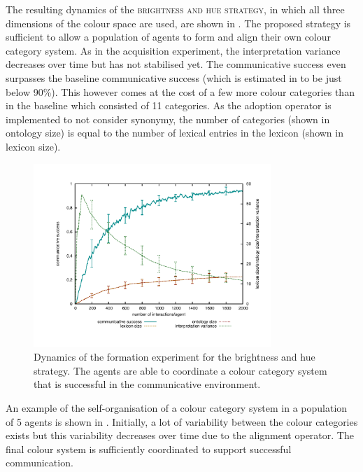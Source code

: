 The resulting dynamics of the \textsc{brightness and hue strategy}, in
which all three dimensions of the colour space are used, are shown in
. The proposed strategy is
sufficient to allow a population of agents to form and align their own
colour category system. As in the acquisition experiment, the
interpretation variance decreases over time but has not stabilised
yet. The communicative success even surpasses the baseline
communicative success (which is estimated in  to be just below 90\%). This however comes at the
cost of a few more colour categories than in the baseline which
consisted of 11 categories. As the adoption operator is implemented to
not consider synonymy, the number of categories (shown in ontology
size) is equal to the number of lexical entries in the lexicon (shown
in lexicon size).

\begin{figure}[htpb]
  \begin{center}
    \includegraphics[width=0.8\textwidth]{./basic-operators/figures/formation-full.pdf}
    \caption[Dynamics of the formation experiment for the brightness
    and hue strategy]{Dynamics of the formation experiment for the
      brightness and hue strategy. The agents are able to coordinate a
      colour category system that is successful in the communicative
      environment.}
    \label{f:formation-full-dynamics}
  \end{center}
\end{figure}

An example of the self-organisation of a colour category system in a
population of 5 agents is shown in . Initially, a lot of variability
between the colour categories exists but this variability decreases
over time due to the alignment operator. The final colour system is
sufficiently coordinated to support successful communication.

